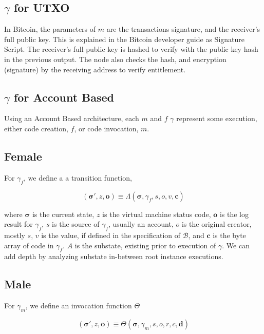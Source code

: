 \documentclass[12pt, titlepage, twocolumn]{report}
\begin{document}
\subsection{\(\gamma\) for UTXO}
In Bitcoin, the parameters of \(m\) are the transactions signature, and the receiver's full public key. This is explained in the Bitcoin developer guide as Signature Script. The receiver's full public key is hashed to verify with the public key hash in the previous output. The node also checks the hash, and encryption (signature) by the receiving address to verify entitlement.


\subsection{\(\gamma\) for Account Based} \label{accbase}
Using an Account Based architecture, each \(m\) and \(f\) \(\gamma\) represent some execution, either code creation, \(f\), or code invocation, \(m\).

\subsection{Female}
For \(\gamma_f\), we define a a transition function,


\begin{equation}
(\boldsymbol{\sigma}', z, \boldsymbol{o}) \equiv \Lambda(\boldsymbol{\sigma}, \gamma_f, s, o, v, \mathbf{c})
\end{equation}

where \(\boldsymbol{\sigma}\) is the current state, \(z\) is the virtual machine status code, \(\boldsymbol{o}\) is the log result for \(\gamma_f\), \(s\) is the source of \(\gamma_f\), usually an account, \(o\) is the original creator, mostly \(s\), \(v\) is the value, if defined in the specification of \( \boldsymbol{\mathcal{B}} \), and \(\mathbf{c}\) is the byte array of code in \(\gamma_f\). \(A\) is the substate, existing prior to execution of \(\gamma\). We can add depth by analyzing substate in-between root instance executions.


\subsection{Male}

For \(\gamma_m\), we define an invocation function \(\Theta\)

\begin{equation}
(\boldsymbol{\sigma}', z, \boldsymbol{o}) \equiv \Theta(\boldsymbol{\sigma}, \gamma_m, s, o, r, c, \mathbf{d})
\end{equation}
\end{document}
